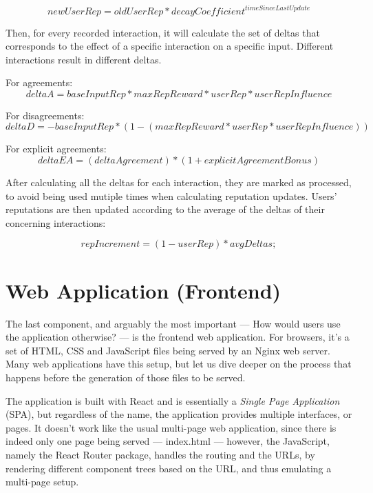 \begin{equation}
    newUserRep = oldUserRep * decayCoefficient^{timeSinceLastUpdate}
\end{equation}

Then, for every recorded interaction, it will calculate the set of deltas that corresponds to the effect of a specific interaction on a specific input. Different interactions result in different deltas.

For agreements:
\begin{equation}
    deltaA = baseInputRep * maxRepReward * userRep * userRepInfluence
\end{equation}

For disagreements:
\begin{equation}
    deltaD = -baseInputRep * (1 - (maxRepReward * userRep * userRepInfluence))
\end{equation}

For explicit agreements:
\begin{equation}
    deltaEA = (deltaAgreement) * (1 + explicitAgreementBonus)
\end{equation}

After calculating all the deltas for each interaction, they are marked as processed, to avoid being used mutiple times when calculating reputation updates. Users' reputations are then updated according to the average of the deltas of their concerning interactions:

\begin{equation}
    repIncrement = (1 - userRep) * avgDeltas;
\end{equation}


\section{Web Application (Frontend)}

The last component, and arguably the most important --- How would users use the application otherwise? --- is the frontend web application. For browsers, it's a set of HTML, CSS and JavaScript files being served by an Nginx web server. Many web applications have this setup, but let us dive deeper on the process that happens before the generation of those files to be served.

The application is built with React and is essentially a \textit{Single Page Application} (SPA), but regardless of the name, the application provides multiple interfaces, or pages. It doesn't work like the usual multi-page web application, since there is indeed only one page being served --- index.html --- however, the JavaScript, namely the React Router package, handles the routing and the URLs, by rendering different component trees based on the URL, and thus emulating a multi-page setup.

